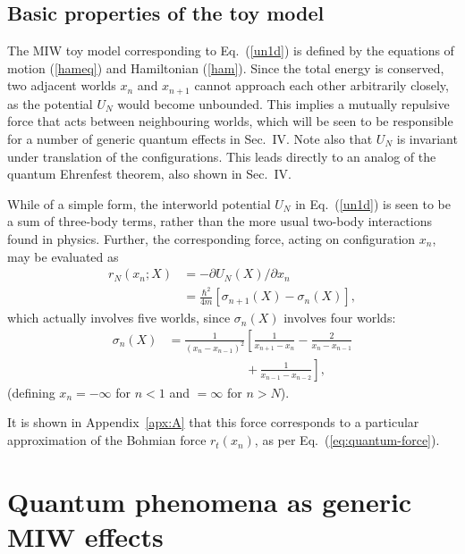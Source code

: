 \documentclass[twocolumn,aps,pra,amsmath,amssymb,superscriptaddress]{revtex4}
\newcommand{\nn}{\nonumber}
\renewcommand{\(}{\left(}
\renewcommand{\)}{\right)}
\newcommand{\red}{\color{red}}
\newcommand{\blk}{\color{black}}
\newcommand{\blu}{\color{blue}}
\renewcommand\blu{\blk}
\renewcommand\red{\blk}
\begin{document}
\subsection{Basic properties of the toy model}\label{sec:prop}

The MIW toy model corresponding to Eq.~(\ref{un1d}) is defined by the equations
of motion (\ref{hameq}) and Hamiltonian (\ref{ham}).  Since the total energy is
conserved, two adjacent worlds $x_n$ and $x_{n+1}$ cannot approach each other
arbitrarily closely, as the potential $U_N$ would become unbounded. This implies
a mutually repulsive force that acts between neighbouring worlds, \blk
which will be seen to be responsible for a number of generic quantum effects in
Sec.~IV.   Note also that $U_N$ is invariant under translation of the
configurations.  This leads directly to an analog of the quantum Ehrenfest
theorem, also shown in Sec.~IV. 

While of a simple form, the interworld potential $U_N$ in Eq.~(\ref{un1d}) is seen to be a sum of three-body terms, rather than the more usual two-body interactions found in physics.    Further, the corresponding force,  acting on configuration $x_n$, may be evaluated as 
\begin{align}
{r}_N({x_n};{X}) &= -\partial U_N({X})/\partial x_n \nn \\
& = \frac{\hbar^2}{4m} [\sigma_{n+1}({X}) - \sigma_n({X})],  \label{hamforce}
\end{align}
\red which actually involves five worlds, since $\sigma_n({X})$ \blk involves \blu four \blk worlds:  
\begin{align}
\sigma_n({X}) &= \frac{1}{(x_{n}-x_{n-1})^2}\left[ \frac{1}{x_{n+1}-x_{n}} - \frac{2}{x_{n}-x_{n-1}} \right. \nn \\ 
&~~~~~~~~~~~~~~~~~~~~~~~~~~~~~\left. 
+\, \frac{1}{x_{n-1}-x_{n-2}}\right] , \label{sigmaforce}
\end{align}\blk 
(defining $x_n=-\infty$ for $n<1$ and $=\infty$ for $n>N$). 


\blk It is shown in
Appendix~\ref{apx:A} that this force corresponds to a particular approximation of the
Bohmian force $r_t(x_n)$, as per Eq.~(\ref{eq:quantum-force}).  



\section{Quantum phenomena as generic MIW effects}\label{sec:phenomena}
\end{document}
